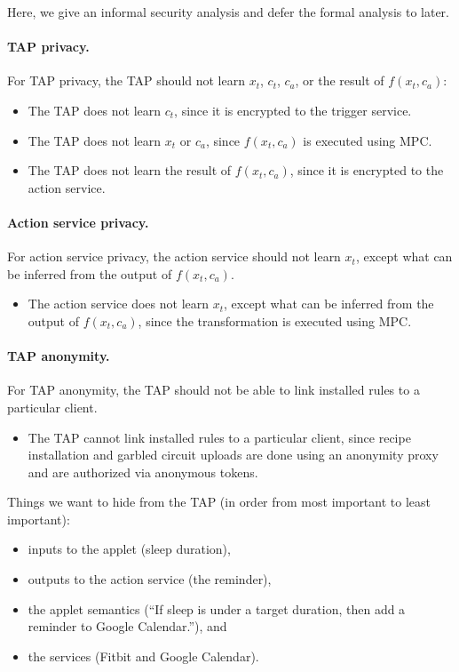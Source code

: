 Here, we give an informal security analysis and defer the formal analysis to
later.

\paragraph{TAP privacy.} For TAP privacy, the TAP should not learn $x_t$, $c_t$,
$c_a$, or the result of $f(x_t, c_a)$:
\begin{itemize}
  \item The TAP does not learn $c_t$, since it is encrypted to the trigger
    service.
  \item The TAP does not learn $x_t$ or $c_a$, since $f(x_t, c_a)$ is executed
    using MPC.
  \item The TAP does not learn the result of $f(x_t, c_a)$, since it is
    encrypted to the action service.
\end{itemize}

\paragraph{Action service privacy.} For action service privacy, the action
service should not learn $x_t$, except what can be inferred from the output of
$f(x_t, c_a)$.
\begin{itemize}
  \item The action service does not learn $x_t$, except what can be inferred
    from the output of $f(x_t, c_a)$, since the transformation is executed using
    MPC.
\end{itemize}

\paragraph{TAP anonymity.} For TAP anonymity, the TAP should not be able to link
installed rules to a particular client.
\begin{itemize}
  \item The TAP cannot link installed rules to a particular client, since recipe
    installation and garbled circuit uploads are done using an anonymity proxy
    and are authorized via anonymous tokens.
\end{itemize}

\iffalse
Things we want to hide from the TAP (in order from most important to least
important):
\begin{itemize}[leftmargin=*]
  \item inputs to the applet (sleep duration),
  \item outputs to the action service (the reminder),
  \item the applet semantics (``If sleep is under a target duration, then add a
    reminder to Google Calendar.''), and
  \item the services (Fitbit and Google Calendar).
\end{itemize}\bigskip


